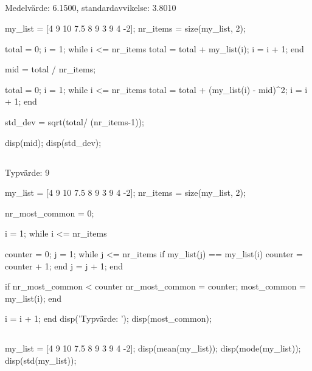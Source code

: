 \newpage
\subsection*{}
Medelvärde: 6.1500, standardavvikelse: 3.8010
\vspace{10pt}
\begin{matlab}
my_list = [4 9 10 7.5 8 9 3 9 4 -2];
nr_items = size(my_list, 2);

total = 0;
i = 1;
while i <= nr_items
    total = total + my_list(i);
    i = i + 1;
end

mid = total / nr_items;

total = 0; %
i = 1;
while i <= nr_items
    total = total + (my_list(i) - mid)^2;
    i = i + 1;
end

std_dev = sqrt(total/ (nr_items-1));

disp(mid);
disp(std_dev);
\end{matlab}

\subsection*{}
Typvärde: 9
\vspace{10pt}
\begin{matlab}
my_list = [4 9 10 7.5 8 9 3 9 4 -2];
nr_items = size(my_list, 2);

nr_most_common = 0; %

i = 1;
while i <= nr_items

	counter = 0;
	j = 1;
	while j <= nr_items
		if my_list(j) == my_list(i)
			counter = counter + 1;
		end
		j = j + 1;
	end

	if nr_most_common < counter
		nr_most_common = counter;
		most_common = my_list(i);
	end

	i = i + 1;
end
disp('Typvärde: ');
disp(most_common);
\end{matlab}


\subsection*{}
\vspace{3pt}
\begin{matlab}
my_list = [4 9 10 7.5 8 9 3 9 4 -2];
disp(mean(my_list)); %
disp(mode(my_list)); %
disp(std(my_list)); %
\end{matlab}

